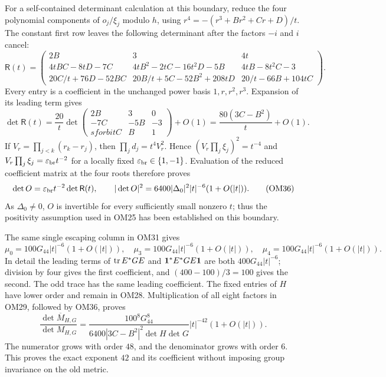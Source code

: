 For a self-contained determinant calculation at this boundary,
reduce the four polynomial components of $o_j/\xi_j$ modulo
$h$, using $r^4=-(r^3+Br^2+Cr+D)/t$.
The constant first row leaves the following determinant after
the factors $-i$ and $i$ cancel:
\[
\mathsf R(t)=\begin{pmatrix}
2B&3&4t\\
4tBC-8tD-7C&4tB^2-2tC-16t^2D-5B&4tB-8t^2C-3\\
20C/t+76D-52BC&20B/t+5C-52B^2+208tD&20/t-66B+104tC
\end{pmatrix}.
\tag{OM34}
\]
Every entry is a coefficient in the unchanged power basis
$1,r,r^2,r^3$.  Expansion of its leading term gives
\[
\det\mathsf R(t)
=\frac{20}{t}
\det\begin{pmatrix}2B&3&0\\-7C&-5B&-3\\sforbitC&B&1\end{pmatrix}
 +O(1)
=\frac{80(3C-B^2)}t+O(1).
\tag{OM35}
\]
If $V_r=\prod_{j<k}(r_k-r_j)$, then
$\prod_jd_j=t^4V_r^2$.  Hence
$(V_r\prod_j\xi_j)^2=t^{-4}$ and
$V_r\prod_j\xi_j=\varepsilon_{\rm br}t^{-2}$ for a locally fixed
$\varepsilon_{\rm br}\in\{1,-1\}$.  Evaluation of the reduced
coefficient matrix at the four roots therefore proves
\[
\det O=\varepsilon_{\rm br}t^{-2}\det\mathsf R(t),\qquad
|\det O|^2=6400|\Delta_0|^2|t|^{-6}(1+O(|t|)).
\tag{OM36}
\]
As $\Delta_0\ne0$, $O$ is invertible for every sufficiently small
nonzero $t$; thus the positivity assumption used in OM25 has
been established on this boundary.

The same single escaping column in OM31 gives
\[
\mu_0=100G_{44}|t|^{-6}(1+O(|t|)),\quad
\mu_3=100G_{44}|t|^{-6}(1+O(|t|)),\quad
\mu_4=100G_{44}|t|^{-6}(1+O(|t|)).
\tag{OM37}
\]
In detail the leading terms of $\operatorname{tr} E^*GE$ and
$\mathbf 1^*E^*GE\mathbf 1$ are both $400G_{44}|t|^{-6}$;
division by four gives the first coefficient, and
$(400-100)/3=100$ gives the second.
The odd trace has the same leading coefficient.  The fixed
entries of $H$ have lower order and remain in OM28.
Multiplication of all eight factors in OM29, followed by OM36,
proves
\[
\boxed{\frac{\det\overline M_{H,G}}{\det M_{H,G}}
=\frac{100^8G_{44}^8}
 {6400|3C-B^2|^2\det H\det G}
 |t|^{-42}(1+O(|t|)).}
\tag{OM38}
\]
The numerator grows with order $48$, and the denominator grows
with order $6$.  This proves the exact exponent $42$ and its
coefficient without imposing group invariance on the old metric.

